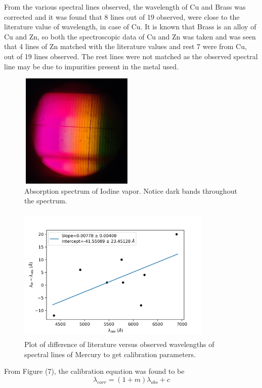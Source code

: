 \documentclass[a4paper, amsfonts, amssymb, amsmath, reprint, showkeys, nofootinbib, twoside]{revtex4-1}
\begin{document}
From the various spectral lines observed, the wavelength of Cu and Brass was corrected and it was found that 8 lines out of 19 observed, were close to the literature value of wavelength, in case of Cu. It is known that Brass is an alloy of Cu and Zn, so both the spectroscopic data of Cu and Zn was taken and was seen that 4 lines of Zn matched with the literature values and rest 7 were from Cu, out of 19 lines observed. The rest lines were not matched as the observed spectral line may be due to impurities present in the metal used. 

\begin{figure}[H] %
	\centering
	\includegraphics[width=5.5cm,height=5.5cm]{4} 
	\caption{Absorption spectrum of Iodine vapor. Notice dark bands throughout the spectrum.}
	\label{4}
\end{figure}

\begin{figure}[H] %
	\centering
	\includegraphics[width=9.3cm,height=6.5cm]{6} 
	\caption{Plot of difference of literature versus observed wavelengths of spectral lines of Mercury to get calibration parameters.}
	\label{6}
\end{figure}

From Figure (7), the calibration equation was found to be 
\begin{equation}
	\lambda_{corr}=(1+m)\lambda_{obs}+c
\end{equation}
\end{document}

